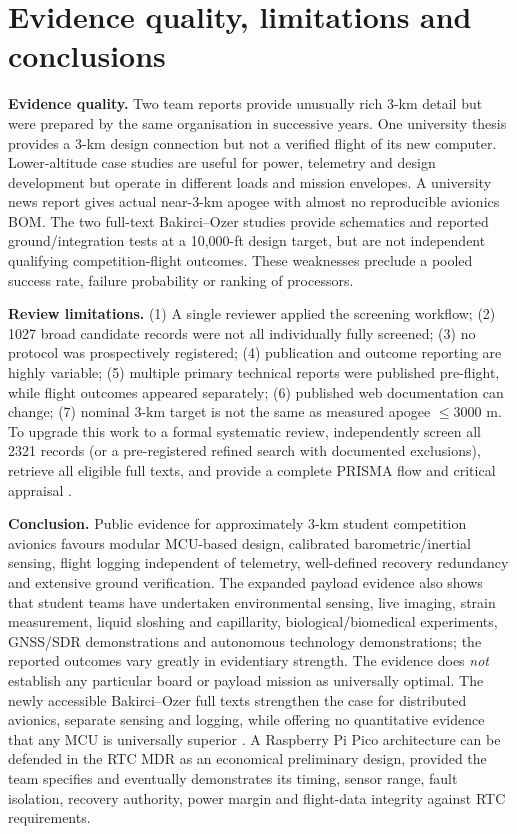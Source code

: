 \documentclass[10pt,a4paper]{article}
\begin{document}
\section{Evidence quality, limitations and conclusions}
\textbf{Evidence quality.} Two team reports provide unusually rich 3-km detail but were prepared by the same organisation in successive years. One university thesis provides a 3-km design connection but not a verified flight of its new computer. Lower-altitude case studies are useful for power, telemetry and design development but operate in different loads and mission envelopes. A university news report gives actual near-3-km apogee with almost no reproducible avionics BOM. The two full-text Bakirci--Ozer studies provide schematics and reported ground/integration tests at a 10,000-ft design target, but are not independent qualifying competition-flight outcomes. These weaknesses preclude a pooled success rate, failure probability or ranking of processors.

\textbf{Review limitations.} (1) A single reviewer applied the screening workflow; (2) 1027 broad candidate records were not all individually fully screened; (3) no protocol was prospectively registered; (4) publication and outcome reporting are highly variable; (5) multiple primary technical reports were published pre-flight, while flight outcomes appeared separately; (6) published web documentation can change; (7) nominal 3-km target is not the same as measured apogee $\leq3000$ m. To upgrade this work to a formal systematic review, independently screen all 2321 records (or a pre-registered refined search with documented exclusions), retrieve all eligible full texts, and provide a complete PRISMA flow and critical appraisal \cite{page2021,rethlefsen2021}.

\textbf{Conclusion.} Public evidence for approximately 3-km student competition avionics favours modular MCU-based design, calibrated barometric/inertial sensing, flight logging independent of telemetry, well-defined recovery redundancy and extensive ground verification. The expanded payload evidence also shows that student teams have undertaken environmental sensing, live imaging, strain measurement, liquid sloshing and capillarity, biological/biomedical experiments, GNSS/SDR demonstrations and autonomous technology demonstrations; the reported outcomes vary greatly in evidentiary strength. The evidence does \emph{not} establish any particular board or payload mission as universally optimal. The newly accessible Bakirci--Ozer full texts strengthen the case for distributed avionics, separate sensing and logging, while offering no quantitative evidence that any MCU is universally superior \cite{bakirci2022,bakirci2022recovery}. A Raspberry Pi Pico architecture can be defended in the RTC MDR as an economical preliminary design, provided the team specifies and eventually demonstrates its timing, sensor range, fault isolation, recovery authority, power margin and flight-data integrity against RTC requirements.

\printbibliography[title={References}]
\end{document}

